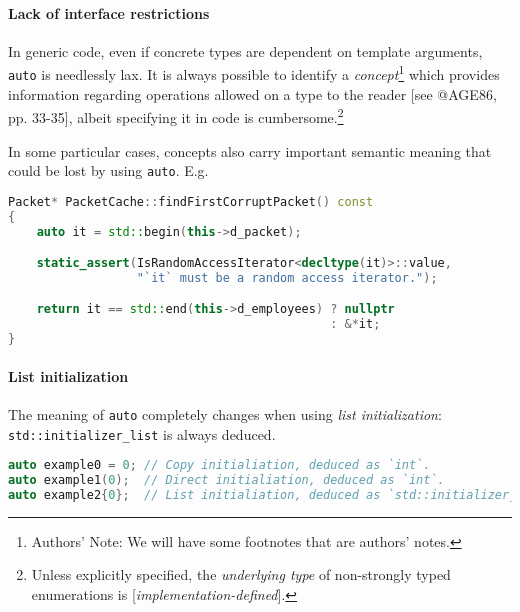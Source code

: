 \documentclass[twoside,10pt,letterpaper,usenames]{newstyle-PearsonGeneric-7-38}
\begin{document}
\paragraph[Lack of interface restrictions]{Lack of interface restrictions}\label{lack-of-interface-restrictions}

In generic code, even if concrete types are dependent on template
arguments, \texttt{auto} is needlessly lax. It is always possible to
identify a \emph{concept}{\cprotect\footnote{Authors' Note: We will have
  some footnotes that are authors' notes.}} which provides information
regarding operations allowed on a type to the reader {[}see @AGE86, pp.
33-35{]}, albeit specifying it in code is
cumbersome.{\cprotect\footnote{Unless explicitly specified, the
  \emph{underlying type} of non-strongly typed enumerations is
  {[}\emph{implementation-defined}{]}.}}

In some particular cases, concepts also carry important semantic meaning
that could be lost by using \texttt{auto}. E.g.

\begin{lstlisting}[language=C++, caption={missing caption}, label={testlabel}, frame=tb]
Packet* PacketCache::findFirstCorruptPacket() const
{
    auto it = std::begin(this->d_packet);

    static_assert(IsRandomAccessIterator<decltype(it)>::value,
                  "`it` must be a random access iterator.");

    return it == std::end(this->d_employees) ? nullptr
                                             : &*it;
}
\end{lstlisting}
    

\paragraph[List initialization]{List initialization}\label{list-initialization}

The meaning of \texttt{auto} completely changes when using \emph{list
initialization}: \texttt{std::initializer\_list} is always deduced.

\begin{lstlisting}[language=C++, caption={missing caption}, label={testlabel}, frame=tb]
auto example0 = 0; // Copy initialiation, deduced as `int`.
auto example1(0);  // Direct initialiation, deduced as `int`.
auto example2{0};  // List initialiation, deduced as `std::initializer_list<int>`.
\end{lstlisting}
    
\end{document}
